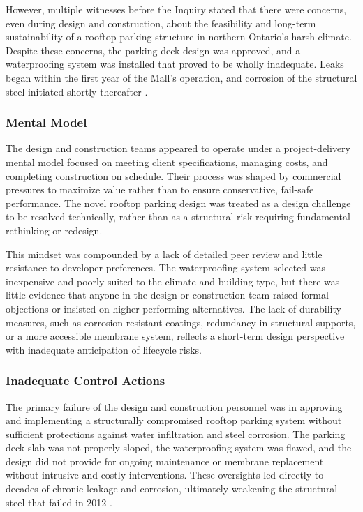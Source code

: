 \documentclass[12pt]{article}
\begin{document}
However, multiple witnesses before the Inquiry stated that there were concerns, even during design and construction, about the feasibility and long-term sustainability of a rooftop parking structure in northern Ontario’s harsh climate. Despite these concerns, the parking deck design was approved, and a waterproofing system was installed that proved to be wholly inadequate. Leaks began within the first year of the Mall’s operation, and corrosion of the structural steel initiated shortly thereafter \cite[p68–70]{AlgoLakeReport1}.

\subsubsection*{Mental Model}

The design and construction teams appeared to operate under a project-delivery mental model focused on meeting client specifications, managing costs, and completing construction on schedule. Their process was shaped by commercial pressures to maximize value rather than to ensure conservative, fail-safe performance. The novel rooftop parking design was treated as a design challenge to be resolved technically, rather than as a structural risk requiring fundamental rethinking or redesign.

This mindset was compounded by a lack of detailed peer review and little resistance to developer preferences. The waterproofing system selected was inexpensive and poorly suited to the climate and building type, but there was little evidence that anyone in the design or construction team raised formal objections or insisted on higher-performing alternatives. The lack of durability measures, such as corrosion-resistant coatings, redundancy in structural supports, or a more accessible membrane system, reflects a short-term design perspective with inadequate anticipation of lifecycle risks.

\subsubsection*{Inadequate Control Actions}

The primary failure of the design and construction personnel was in approving and implementing a structurally compromised rooftop parking system without sufficient protections against water infiltration and steel corrosion. The parking deck slab was not properly sloped, the waterproofing system was flawed, and the design did not provide for ongoing maintenance or membrane replacement without intrusive and costly interventions. These oversights led directly to decades of chronic leakage and corrosion, ultimately weakening the structural steel that failed in 2012 \cite[p68–70]{AlgoLakeReport1}.
\end{document}
